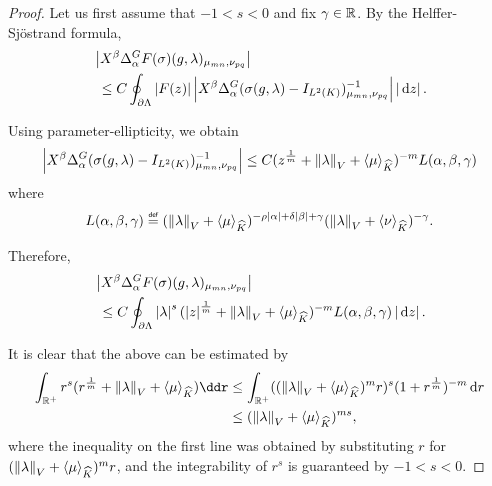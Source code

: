 \begin{proof}
    Let us first assume that $-1 < s < 0$ and fix $\gamma \in \mathbb{R}$.
    By the Helffer-Sj\"ostrand formula,
    \begin{align*}
        &\abs {%
            \LeftDifferentialOperator \beta \DifferenceOperator \alpha
            F(\sigma)(g, \lambda)_{\mu_{m n}, \nu_{p q}}
        }\\
        &\ \leq C \oint_{\partial \Lambda} \abs {F(z)}
        \abs {%
            \LeftDifferentialOperator \beta \DifferenceOperator \alpha
            (\sigma(g, \lambda) - \Id {\Lebesgue 2 \CompactGroup})^{-1}_{\mu_{m n}, \nu_{p q}}
        } \abs {\dd z}.
    \end{align*}

    Using parameter-ellipticity,
    we obtain
    \begin{align*}
        \abs {%
            \LeftDifferentialOperator \beta \DifferenceOperator \alpha
            (\sigma(g, \lambda) - \Id {\Lebesgue 2 \CompactGroup})^{-1}_{\mu_{m n}, \nu_{p q}}
        }
        \leq
        C
        (z^{\frac 1 m} + \norm [\VectorSpace] \lambda + \JapaneseBracket \CompactGroup \mu)^{-m}
        L(\alpha, \beta, \gamma)
    \end{align*}
    where
    \begin{align*}
        L(\alpha, \beta, \gamma) \defeq
        (\norm [\VectorSpace] \lambda + \JapaneseBracket \CompactGroup \mu)^{-\rho \abs \alpha + \delta \abs \beta + \gamma}
        (\norm [\VectorSpace] \lambda + \JapaneseBracket \CompactGroup \nu)^{-\gamma}.
    \end{align*}

    Therefore,
    \begin{align*}
        &\abs {%
            \LeftDifferentialOperator \beta \DifferenceOperator \alpha
            F(\sigma)(g, \lambda)_{\mu_{m n}, \nu_{p q}}
        }\\
        &\ \leq C \oint_{\partial \Lambda}
        \abs \lambda^s
        (\abs z^{\frac 1 m} + \norm [\VectorSpace] \lambda + \JapaneseBracket \CompactGroup \mu)^{-m} L(\alpha, \beta, \gamma) \abs {\dd z}.
    \end{align*}

    It is clear that the above can be estimated by
    \begin{align*}
        \int_{\R^+} r^s (r^{\frac 1 m} + \norm \lambda + \JapaneseBracket \CompactGroup \mu) \ddr
        &\leq \int_{\R^+} ((\norm \lambda + \JapaneseBracket \CompactGroup \mu)^m r)^s (1 + r^{\frac 1 m})^{-m} \dd r\\
        &\leq (\norm \lambda + \JapaneseBracket \CompactGroup \mu)^{m s},
    \end{align*}
    where the inequality on the first line was obtained by substituting $r$ for $({\left\| \lambda \right\|}_{V} + {\langle \mu \rangle}_{{\widehat{K}}})^m r$,
    and the integrability of $r^s$ is guaranteed by $-1 < s < 0$.


\end{proof}
